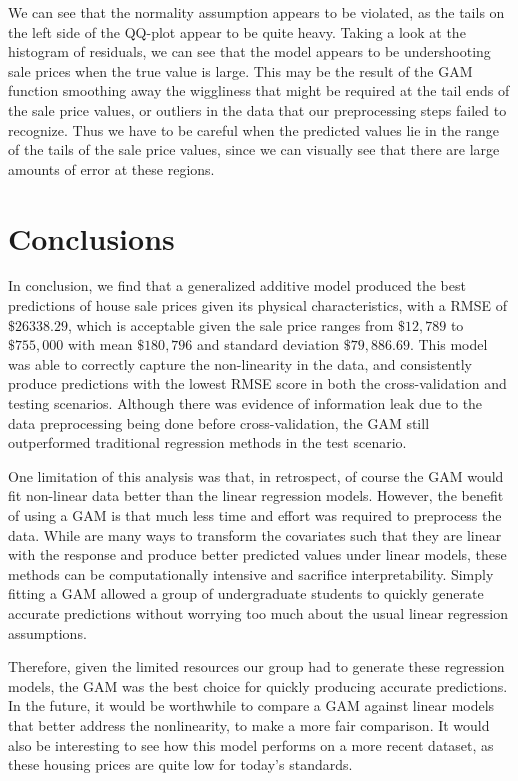 \documentclass[aoas]{imsart}
\numberwithin{equation}{section}
\theoremstyle{plain}
\theoremstyle{remark}
\begin{document}
We can see that the normality assumption appears to be violated, as the
tails on the left side of the QQ-plot appear to be quite heavy. Taking a
look at the histogram of residuals, we can see that the model appears to
be undershooting sale prices when the true value is large. This may be
the result of the GAM function smoothing away the wiggliness that might
be required at the tail ends of the sale price values, or outliers in
the data that our preprocessing steps failed to recognize. Thus we have
to be careful when the predicted values lie in the range of the tails of
the sale price values, since we can visually see that there are large
amounts of error at these regions.

\hypertarget{conclusions}{%
\section{Conclusions}\label{conclusions}}

In conclusion, we find that a generalized additive model produced the
best predictions of house sale prices given its physical
characteristics, with a RMSE of \(\$26338.29\), which is acceptable
given the sale price ranges from \(\$12,789\) to \(\$755,000\) with mean
\(\$180,796\) and standard deviation \(\$79,886.69\). This model was
able to correctly capture the non-linearity in the data, and
consistently produce predictions with the lowest RMSE score in both the
cross-validation and testing scenarios. Although there was evidence of
information leak due to the data preprocessing being done before
cross-validation, the GAM still outperformed traditional regression
methods in the test scenario.

One limitation of this analysis was that, in retrospect, of course the
GAM would fit non-linear data better than the linear regression models.
However, the benefit of using a GAM is that much less time and effort
was required to preprocess the data. While are many ways to transform
the covariates such that they are linear with the response and produce
better predicted values under linear models, these methods can be
computationally intensive and sacrifice interpretability. Simply fitting
a GAM allowed a group of undergraduate students to quickly generate
accurate predictions without worrying too much about the usual linear
regression assumptions.

Therefore, given the limited resources our group had to generate these
regression models, the GAM was the best choice for quickly producing
accurate predictions. In the future, it would be worthwhile to compare a
GAM against linear models that better address the nonlinearity, to make
a more fair comparison. It would also be interesting to see how this
model performs on a more recent dataset, as these housing prices are
quite low for today's standards.



\end{document}
